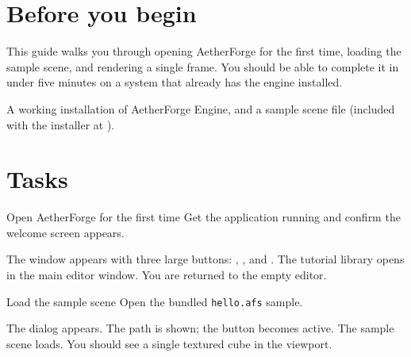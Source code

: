 \documentclass[11pt]{article}
\begin{document}
\makedoctocpage

\section{Before you begin}

This guide walks you through opening AetherForge for the first time,
loading the sample scene, and rendering a single frame. You should be
able to complete it in under five minutes on a system that already has
the engine installed.

\begin{UserNote}
A working installation of AetherForge Engine, and a sample scene file
(included with the installer at ).
\end{UserNote}

\section{Tasks}

\begin{task}{Open AetherForge for the first time}{%
  Get the application running and confirm the welcome screen appears.}
\begin{stepresult}
     {The  window appears with three
      large buttons: , , and
      .}
     {The tutorial library opens in the main editor window.}
     {You are returned to the empty editor.}
\end{stepresult}
\end{task}

\begin{task}{Load the sample scene}{%
  Open the bundled \texttt{hello.afs} sample.}
\begin{stepresult}
     {The  dialog appears.}
     {The path is shown; the  button becomes active.}
     {The sample scene loads. You should see a single textured cube in
      the viewport.}
\end{stepresult}
\end{task}
\end{document}
